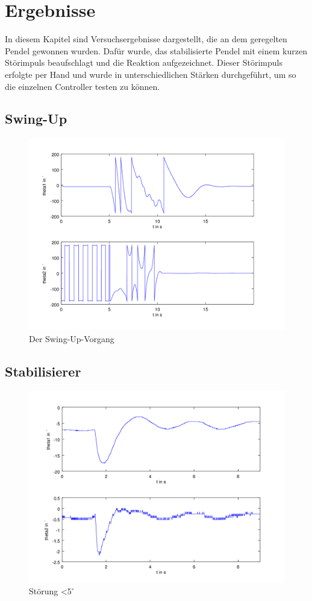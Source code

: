 \section{Ergebnisse}
In diesem Kapitel sind Versuchsergebnisse dargestellt, die an dem geregelten Pendel gewonnen wurden. Dafür wurde, das stabilisierte Pendel mit einem kurzen Störimpuls beaufschlagt und die Reaktion aufgezeichnet. Dieser Störimpuls erfolgte per Hand und wurde in unterschiedlichen Stärken durchgeführt, um so die einzelnen Controller testen zu können. 
\subsection{Swing-Up}
\begin{figure}[htbp]
	\label{fig.Swing-Up-Plot}
	\centering
	\includegraphics[width=1.\textwidth]{Grafiken/Swing-Up_kurz.png}
	\caption{Der Swing-Up-Vorgang}
\end{figure}

\subsection{Stabilisierer}
\begin{figure}[htbp]
	\label{fig.Stabilisierer-Plot}
	\centering
	\includegraphics[width=1.\textwidth]{Grafiken/Stab_lang.png}
	\caption{Störung \textless $5^{\circ}$}
\end{figure}

